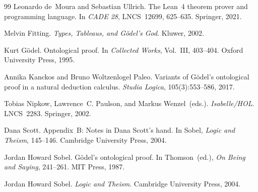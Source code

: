 \documentclass[11pt]{article}
\begin{document}
\begin{thebibliography}{99}
Leonardo de~Moura and Sebastian Ullrich.
\newblock The Lean~4 theorem prover and programming language.
\newblock In \emph{CADE 28}, LNCS~12699, 625--635. Springer, 2021.

Melvin Fitting.
\newblock \emph{Types, Tableaus, and G\"odel's God}.
\newblock Kluwer, 2002.

Kurt G\"odel.
\newblock Ontological proof.
\newblock In \emph{Collected Works}, Vol.~III, 403--404. Oxford University Press, 1995.

Annika Kanckos and Bruno Woltzenlogel Paleo.
\newblock Variants of G\"odel's ontological proof in a natural deduction calculus.
\newblock \emph{Studia Logica}, 105(3):553--586, 2017.

Tobias Nipkow, Lawrence~C. Paulson, and Markus Wenzel~(eds.).
\newblock \emph{Isabelle/HOL}.
\newblock LNCS~2283. Springer, 2002.

Dana Scott.
\newblock Appendix~B: Notes in Dana Scott's hand.
\newblock In Sobel, \emph{Logic and Theism}, 145--146. Cambridge University Press, 2004.

Jordan Howard Sobel.
\newblock G\"odel's ontological proof.
\newblock In Thomson~(ed.), \emph{On Being and Saying}, 241--261. MIT Press, 1987.

Jordan Howard Sobel.
\newblock \emph{Logic and Theism}.
\newblock Cambridge University Press, 2004.

\end{thebibliography}
\end{document}
